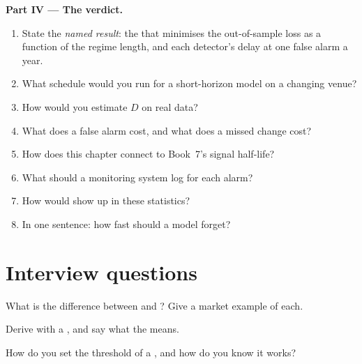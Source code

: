 \begin{problem}
\medskip\noindent\textbf{Part IV --- The verdict.}
\begin{enumerate}[resume]
\item State the \emph{named result}: the  that minimises the out-of-sample loss as a function of the regime
length, and each detector's delay at one false alarm a year.
\item What schedule would you run for a short-horizon model on a changing venue?
\item How would you estimate $D$ on real data?
\item What does a false alarm cost, and what does a missed change cost?
\item How does this chapter connect to Book~7's signal half-life?
\item What should a monitoring system log for each alarm?
\item How would  show up in these statistics?
\item In one sentence: how fast should a model forget?
\end{enumerate}
\end{problem}

\section{Interview questions}

\begin{interviewq}\label{iq:ml:online-learning-and-drift:1}
What is the difference between  and ? Give a market example of each.
\end{interviewq}

\begin{interviewq}\label{iq:ml:online-learning-and-drift:2}
Derive  with a , and say what the  means.
\end{interviewq}

\begin{interviewq}\label{iq:ml:online-learning-and-drift:3}
How do you set the threshold of a , and how do you know it works?
\end{interviewq}

